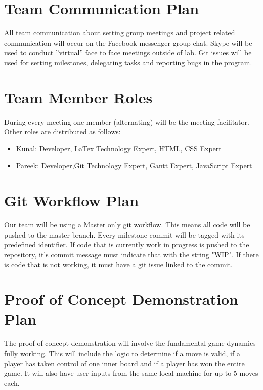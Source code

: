 \documentclass{article}
\begin{document}
\section{Team Communication Plan}
All team communication about setting group
meetings and project related communication will occur on the Facebook messenger
group chat. Skype will be used to conduct ''virtual'' face to face meetings
outside of lab. Git issues will be used for setting milestones, delegating tasks
and reporting bugs in the program.

\section{Team Member Roles}
During every meeting one member (alternating) will
be the meeting facilitator. Other roles are distributed
as follows:
\begin{itemize}
  \item Kunal: Developer, LaTex Technology Expert, HTML, CSS Expert 
  \item Pareek: Developer,Git Technology Expert, Gantt Expert, JavaScript Expert 

\end{itemize}

\section{Git Workflow Plan}
Our team will be using a Master only git workflow.
This means all code will be pushed to the master branch. Every milestone commit
will be tagged with its predefined identifier. If code that is currently work in
progress is pushed to the repository, it's commit message must indicate that with the
string "WIP". If there is code that is not working, it must have a git issue
linked to the commit.

\section{Proof of Concept Demonstration Plan}
The proof of concept demonstration will involve the fundamental game dynamics
fully working. This will include the logic to determine if a move is valid, if a
player has taken control of one inner board and if a player has won the entire
game. It will also have user inputs from the same local machine for up to 5
moves each.
\end{document}
